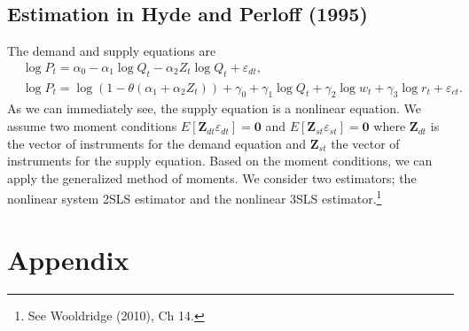 \documentclass[11pt, a4paper]{article}
\numberwithin{figure}{section}
\theoremstyle{definition}
\newcommand{\0}{\mathbf{0}}
\newcommand{\bmZ}{\bm{Z}}
\begin{document}
\subsection{Estimation in Hyde and Perloff (1995)}
The demand and supply equations are
\begin{align*}
    &\log P_{t} = \alpha_0 - \alpha_1 \log Q_t - \alpha_2 Z_t\log Q_t + \varepsilon_{dt},\\
    &\log P_t  = \log(1 - \theta(\alpha_1 + \alpha_2 Z_t)) + \gamma_0 + \gamma_1 \log Q_t +  \gamma_2 \log w_t + \gamma_3 \log r_t + \varepsilon_{ct}.
\end{align*}
As we can immediately see, the supply equation is a nonlinear equation.
We assume two moment conditions $E[\bmZ_{dt} \varepsilon_{dt}] = \bm0 $ and $ E[\bmZ_{st} \varepsilon_{st}] =\bm0$ where $\bmZ_{dt}$ is the vector of instruments for the demand equation and $\bmZ_{st}$ the vector of instruments for the supply equation.
Based on the moment conditions, we can apply the generalized method of moments.
We consider two estimators; the nonlinear system 2SLS estimator and the nonlinear 3SLS estimator.\footnote{See Wooldridge (2010), Ch 14.}

\section*{Appendix}





\end{document}
